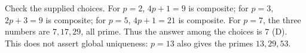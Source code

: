 Check the supplied choices. For $p=2$, $4p+1=9$ is composite; for $p=3$, $2p+3=9$ is composite; for $p=5$, $4p+1=21$ is composite. For $p=7$, the three numbers are $7,17,29$, all prime. Thus the answer among the choices is $\boxed 7$ (D). This does not assert global uniqueness: $p=13$ also gives the primes $13,29,53$.
